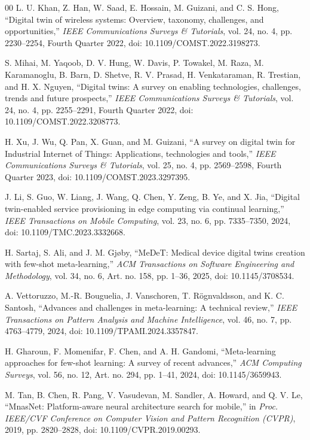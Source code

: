 \documentclass[a4paper,fleqn]{cas-sc}
\begin{document}
\begin{thebibliography}{00}
 L. U. Khan, Z. Han, W. Saad, E. Hossain, M. Guizani, and C. S. Hong, ``Digital twin of wireless systems: Overview, taxonomy, challenges, and opportunities,'' \emph{IEEE Communications Surveys \& Tutorials}, vol. 24, no. 4, pp. 2230--2254, Fourth Quarter 2022, doi: 10.1109/COMST.2022.3198273.

 S. Mihai, M. Yaqoob, D. V. Hung, W. Davis, P. Towakel, M. Raza, M. Karamanoglu, B. Barn, D. Shetve, R. V. Prasad, H. Venkataraman, R. Trestian, and H. X. Nguyen, ``Digital twins: A survey on enabling technologies, challenges, trends and future prospects,'' \emph{IEEE Communications Surveys \& Tutorials}, vol. 24, no. 4, pp. 2255--2291, Fourth Quarter 2022, doi: 10.1109/COMST.2022.3208773.

 H. Xu, J. Wu, Q. Pan, X. Guan, and M. Guizani, ``A survey on digital twin for Industrial Internet of Things: Applications, technologies and tools,'' \emph{IEEE Communications Surveys \& Tutorials}, vol. 25, no. 4, pp. 2569--2598, Fourth Quarter 2023, doi: 10.1109/COMST.2023.3297395.

 J. Li, S. Guo, W. Liang, J. Wang, Q. Chen, Y. Zeng, B. Ye, and X. Jia, ``Digital twin-enabled service provisioning in edge computing via continual learning,'' \emph{IEEE Transactions on Mobile Computing}, vol. 23, no. 6, pp. 7335--7350, 2024, doi: 10.1109/TMC.2023.3332668.

 H. Sartaj, S. Ali, and J. M. Gj{\o}by, ``MeDeT: Medical device digital twins creation with few-shot meta-learning,'' \emph{ACM Transactions on Software Engineering and Methodology}, vol. 34, no. 6, Art. no. 158, pp. 1--36, 2025, doi: 10.1145/3708534.

 A. Vettoruzzo, M.-R. Bouguelia, J. Vanschoren, T. R{\"o}gnvaldsson, and K. C. Santosh, ``Advances and challenges in meta-learning: A technical review,'' \emph{IEEE Transactions on Pattern Analysis and Machine Intelligence}, vol. 46, no. 7, pp. 4763--4779, 2024, doi: 10.1109/TPAMI.2024.3357847.

 H. Gharoun, F. Momenifar, F. Chen, and A. H. Gandomi, ``Meta-learning approaches for few-shot learning: A survey of recent advances,'' \emph{ACM Computing Surveys}, vol. 56, no. 12, Art. no. 294, pp. 1--41, 2024, doi: 10.1145/3659943.

 M. Tan, B. Chen, R. Pang, V. Vasudevan, M. Sandler, A. Howard, and Q. V. Le, ``MnasNet: Platform-aware neural architecture search for mobile,'' in \emph{Proc. IEEE/CVF Conference on Computer Vision and Pattern Recognition (CVPR)}, 2019, pp. 2820--2828, doi: 10.1109/CVPR.2019.00293.


\end{thebibliography}
\end{document}
